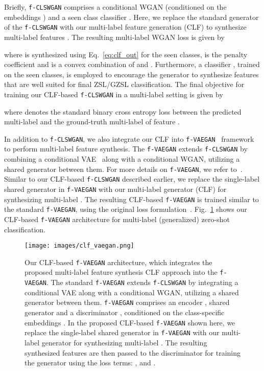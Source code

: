 \documentclass[final]{cvpr}
\newcommand{\clswgan}{\texttt{f-CLSWGAN}}
\newcommand{\vaegan}{\texttt{f-VAEGAN}}
\begin{document}
Briefly, \clswgan{} comprises a conditional WGAN (conditioned on the embeddings ) and a seen class classifier . Here, we replace the standard generator of the \clswgan{} with our multi-label feature generation (CLF) to synthesize multi-label features . The resulting multi-label WGAN loss is given by

where  is synthesized using Eq.~\ref{eq:clf_out} for the seen classes,
 is the penalty coefficient and  is a convex combination of  and . Furthermore, a classifier , trained on the seen classes, is employed to encourage the generator to synthesize features that are well suited for final ZSL/GZSL classification. The final objective for training our CLF-based \clswgan{} in a multi-label setting is given by

where  denotes the standard binary cross entropy loss between the predicted multi-label  and the ground-truth multi-label  of feature .

In addition to \clswgan{}, we also integrate our CLF into \vaegan{}~\cite{xian2019f} framework to perform multi-label feature synthesis. The \vaegan{} extends \clswgan{} by combining a conditional VAE~\cite{kingma13iclr} along with a conditional WGAN, utilizing a shared generator between them. For more details on \vaegan{}, we refer to~\cite{xian2019f}. Similar to our CLF-based \clswgan{} described earlier, we replace the single-label shared generator in \vaegan{} with our multi-label generator (CLF) for synthesizing multi-label . The resulting CLF-based \vaegan{} is trained similar to the standard \vaegan{}, using the original loss formulation~\cite{xian2019f}. Fig.~\ref{fig:overall_arch_vaegan} shows our CLF-based \vaegan{} architecture for multi-label (generalized) zero-shot classification. 


\begin{figure}
    \centering
    \texttt{[image: images/clf\_vaegan.png]}
    \caption{Our CLF-based \vaegan{} architecture, which integrates the proposed multi-label feature synthesis CLF approach into the \vaegan{}. The standard \vaegan{} extends \clswgan{} by integrating a conditional VAE along with a conditional WGAN, utilizing a shared generator between them. \vaegan{} comprises an encoder , shared generator and a discriminator , conditioned on the class-specific embeddings . In the proposed CLF-based \vaegan{} shown here, we replace the single-label shared generator in \vaegan{} with our multi-label generator  for synthesizing multi-label . The resulting synthesized features  are then passed to the discriminator for training the generator using the loss terms: ,  and .\vspace{-0.3cm}}
    \label{fig:overall_arch_vaegan}
\end{figure}
\end{document}
